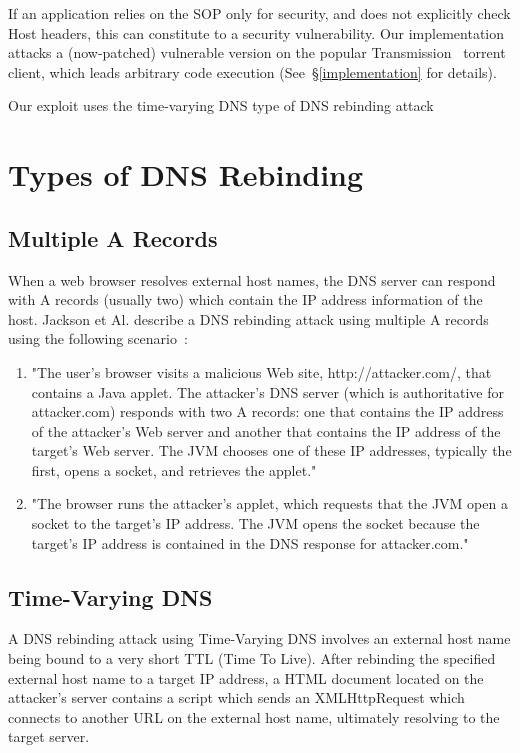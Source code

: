 If an application relies on the SOP only for security, and does not explicitly
check Host headers, this can constitute to a security vulnerability. Our
implementation attacks a (now-patched) vulnerable version on the popular
Transmission~\cite{transmission} torrent client, which leads arbitrary code
execution (See~\S\ref{implementation} for details).

Our exploit uses the time-varying DNS type of DNS rebinding attack

\section{Types of DNS Rebinding}

\subsection{Multiple A Records}

When a web browser resolves external host names, the DNS server can respond
with A records (usually two) which contain the IP address information of
the host. Jackson et Al. describe a DNS rebinding attack using multiple A
records using the following scenario~\cite{jackson2009protecting}:

\begin{enumerate}
	\item{"The user's browser visits a malicious Web site, http://attacker.com/, that
contains a Java applet. The attacker's DNS server (which is authoritative
for attacker.com) responds with two A records: one that contains the IP
address of the attacker's Web server and another that contains the IP address
of the target's Web server. The JVM chooses one of these IP addresses,
typically the first, opens a socket, and retrieves the applet."}
	\item{"The browser runs the attacker's applet, which requests that the JVM open
a socket to the target's IP address. The JVM opens the socket because the
target's IP address is contained in the DNS response for attacker.com."}
\end{enumerate}

\subsection{Time-Varying DNS}

A DNS rebinding attack using Time-Varying DNS involves an external host name
being bound to a very short TTL (Time To Live). After rebinding the specified
external host name to a target IP address, a HTML document located on the
attacker's server contains a script which sends an XMLHttpRequest which
connects to another URL on the external host name, ultimately resolving to
the target server.

